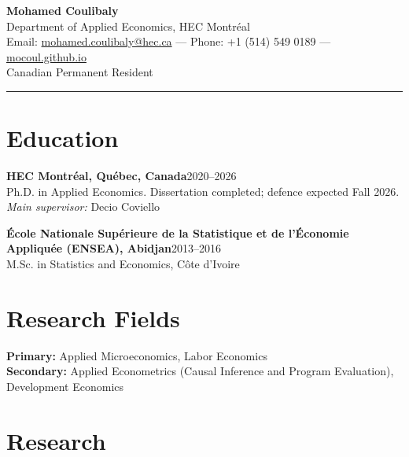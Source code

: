 \documentclass[11pt,letterpaper]{article}
\newcommand{\entry}[2]{\textbf{#1}\hfill #2\\}
\begin{document}
\begin{center}
  {\LARGE\bfseries Mohamed Coulibaly}\\[0.45em]
  Department of Applied Economics, HEC Montr\'eal\\[0.25em]
  Email: \href{mailto:mohamed.coulibaly@hec.ca}{mohamed.coulibaly@hec.ca} \quad---\quad
  Phone: +1 (514) 549 0189 \quad---\quad
  \href{https://mocoul.github.io}{mocoul.github.io}\\[0.25em]
  Canadian Permanent Resident
\end{center}
\vspace{0.3em}
\rule{\textwidth}{0.8pt}

\section{Education}

\entry{HEC Montr\'eal, Qu\'ebec, Canada}{2020--2026}
Ph.D. in Applied Economics. Dissertation completed; defence expected Fall 2026.\\
\textit{Main supervisor:} Decio Coviello

\vspace{0.45em}
\entry{\'Ecole Nationale Sup\'erieure de la Statistique et de l'\'Economie Appliqu\'ee (ENSEA), Abidjan}{2013--2016}
M.Sc. in Statistics and Economics, C\^ote d'Ivoire

\section{Research Fields}

\textbf{Primary:} Applied Microeconomics, Labor Economics\\
\textbf{Secondary:} Applied Econometrics (Causal Inference and Program Evaluation), Development Economics

\section{Research}
\end{document}
